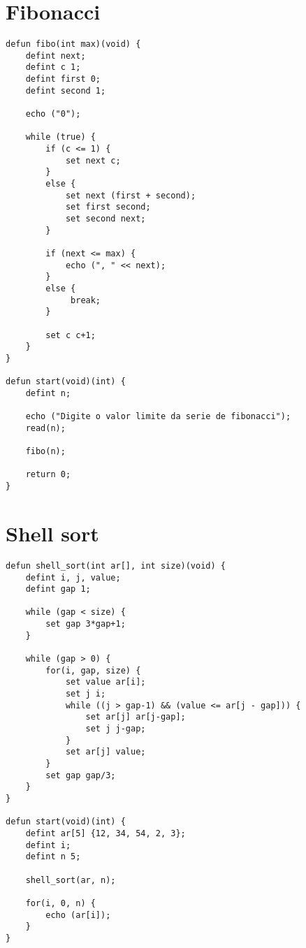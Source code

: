 \documentclass[
  12pt,				%
  oneside,			%
  a4paper,			%
  english,			%
  french,				%
  spanish,			%
  brazil,				%
]{abntex2}
\begin{document}
\section{Fibonacci}
\label{sec:fibonacci}

\begin{lstlisting}[label=code:fibonacci,caption=Programa Fibonacci]
defun fibo(int max)(void) {
    defint next;
    defint c 1;
    defint first 0;
    defint second 1;

    echo ("0");
    
    while (true) {
        if (c <= 1) {
            set next c;
        }
        else {
            set next (first + second);
            set first second;
            set second next;
        }

        if (next <= max) {
            echo (", " << next);
        }
        else {
             break;
        }
        
        set c c+1;
    }
}

defun start(void)(int) {
    defint n;

    echo ("Digite o valor limite da serie de fibonacci");
    read(n);

    fibo(n);

    return 0;
}  
\end{lstlisting}

\section{Shell sort}
\label{sec:shell-sort}

\begin{lstlisting}[label=code:shell-sort,caption=Programa do shell
  sort]
defun shell_sort(int ar[], int size)(void) {
    defint i, j, value;
    defint gap 1;
    
    while (gap < size) {
        set gap 3*gap+1;
    }

    while (gap > 0) {
        for(i, gap, size) {
            set value ar[i];
            set j i;
            while ((j > gap-1) && (value <= ar[j - gap])) {
                set ar[j] ar[j-gap];
                set j j-gap;
            }
            set ar[j] value;
        }
        set gap gap/3;
    }
}

defun start(void)(int) {
    defint ar[5] {12, 34, 54, 2, 3};
    defint i;
    defint n 5;

    shell_sort(ar, n);

    for(i, 0, n) {
        echo (ar[i]);
    }
}
\end{lstlisting}
\end{document}
